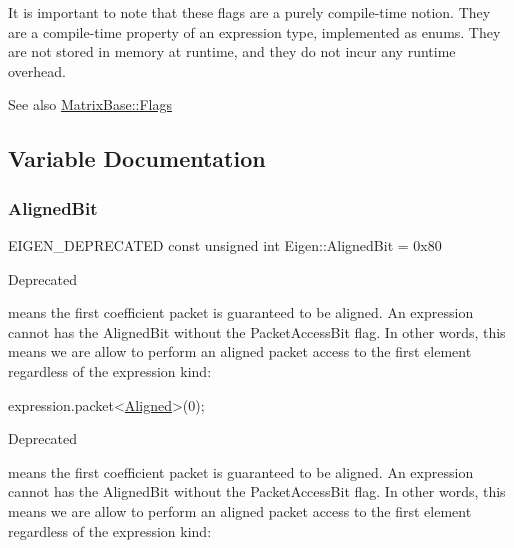 It is important to note that these flags are a purely compile-\/time notion. They are a compile-\/time property of an expression type, implemented as enum\textquotesingle{}s. They are not stored in memory at runtime, and they do not incur any runtime overhead.

\begin{DoxySeeAlso}{See also}
\hyperlink{group___core___module_a9784b8701c2d1c79fa8000e1b3ebdb8baba17ecd6acac1351b99647317b211148}{Matrix\+Base\+::\+Flags} 
\end{DoxySeeAlso}


\subsection{Variable Documentation}
\mbox{\label{group__flags_gac5795adacd266512a26890973503ed88}} 
\subsubsection{\texorpdfstring{Aligned\+Bit}{AlignedBit}}
{\footnotesize\ttfamily E\+I\+G\+E\+N\+\_\+\+D\+E\+P\+R\+E\+C\+A\+T\+ED const unsigned int Eigen\+::\+Aligned\+Bit = 0x80}

\begin{DoxyRefDesc}{Deprecated}
\item[\hyperlink{deprecated__deprecated000013}{Deprecated}]means the first coefficient packet is guaranteed to be aligned. An expression cannot has the Aligned\+Bit without the Packet\+Access\+Bit flag. In other words, this means we are allow to perform an aligned packet access to the first element regardless of the expression kind\+: \end{DoxyRefDesc}

\begin{DoxyCode}
expression.packet<\hyperlink{group__enums_gga45fe06e29902b7a2773de05ba27b47a1ad37d4c71425bb286e9b4103830538fbf}{Aligned}>(0);
\end{DoxyCode}


\begin{DoxyRefDesc}{Deprecated}
\item[\hyperlink{deprecated__deprecated000057}{Deprecated}]means the first coefficient packet is guaranteed to be aligned. An expression cannot has the Aligned\+Bit without the Packet\+Access\+Bit flag. In other words, this means we are allow to perform an aligned packet access to the first element regardless of the expression kind\+: \end{DoxyRefDesc}

